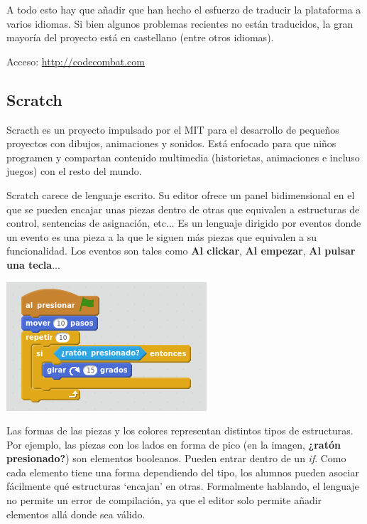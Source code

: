 \documentclass{report}
\begin{document}
	\vspace{10px}
	
	A todo esto hay que añadir que han hecho el esfuerzo de traducir la plataforma a varios idiomas. Si bien algunos problemas recientes no están traducidos, la gran mayoría del proyecto está en castellano (entre otros idiomas).
	
	\vspace{10px}
	
	Acceso: \url{http://codecombat.com}
	
	\subsection{Scratch}
	
	Scracth es un proyecto impulsado por el MIT para el desarrollo de pequeños proyectos con dibujos, animaciones y sonidos. Está enfocado para que niños programen y compartan contenido multimedia (historietas, animaciones e incluso juegos) con el resto del mundo. 
	
	Scratch carece de lenguaje escrito. Su editor ofrece un panel bidimensional en el que se pueden encajar unas piezas dentro de otras que equivalen a estructuras de control, sentencias de asignación, etc... Es un lenguaje dirigido por eventos donde un evento es una pieza a la que le siguen más piezas que equivalen a su funcionalidad. Los eventos son tales como \textbf{Al clickar}, \textbf{Al empezar}, \textbf{Al pulsar una tecla}...
	
	\begin{center}
	\includegraphics[width=0.7\linewidth]{scratch}
	\end{center}

	Las formas de las piezas y los colores representan distintos tipos de estructuras. Por ejemplo, las piezas con los lados en forma de pico (en la imagen, \textbf{¿ratón presionado?}) son elementos booleanos. Pueden entrar dentro de un \textit{if}. Como cada elemento tiene una forma dependiendo del tipo, los alumnos pueden asociar fácilmente qué estructuras `encajan' en otras. Formalmente hablando, el lenguaje no permite un error de compilación, ya que el editor solo permite añadir elementos allá donde sea válido.
\end{document}
